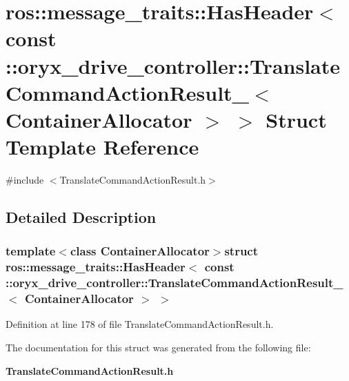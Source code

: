\section{ros\-:\-:message\-\_\-traits\-:\-:\-Has\-Header$<$ const \-:\-:oryx\-\_\-drive\-\_\-controller\-:\-:\-Translate\-Command\-Action\-Result\-\_\-$<$ \-Container\-Allocator $>$ $>$ \-Struct \-Template \-Reference}
\label{structros_1_1message__traits_1_1HasHeader_3_01const_01_1_1oryx__drive__controller_1_1TranslateCof2bde71ab08f6df6e31d5e5876c4a61b}


{\ttfamily \#include $<$\-Translate\-Command\-Action\-Result.\-h$>$}



\subsection{\-Detailed \-Description}
\subsubsection*{template$<$class Container\-Allocator$>$struct ros\-::message\-\_\-traits\-::\-Has\-Header$<$ const \-::oryx\-\_\-drive\-\_\-controller\-::\-Translate\-Command\-Action\-Result\-\_\-$<$ Container\-Allocator $>$ $>$}



\-Definition at line 178 of file \-Translate\-Command\-Action\-Result.\-h.



\-The documentation for this struct was generated from the following file\-:\begin{DoxyCompactItemize}
\item 
{\bf \-Translate\-Command\-Action\-Result.\-h}\end{DoxyCompactItemize}
